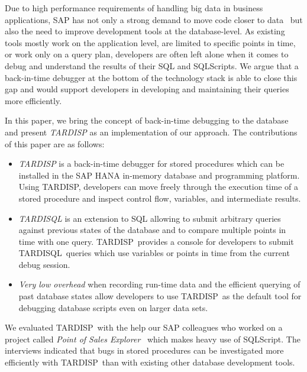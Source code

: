 \documentclass[english]{sig-alternate-05-2015}
\newcommand{\tool}{TARDISP}
\newcommand{\SQLextension}{TARDISQL}
\begin{document}
Due to high performance requirements of handling big data in business applications, SAP has not only a strong demand to move code closer to data~\cite{plattner2015memory} but also the need to improve development tools at the database-level. 
As existing tools mostly work on the application level, are limited to specific points in time, or work only on a query plan, developers are often left alone when it comes to debug and understand the results of their SQL and SQLScripts.
We argue that a back-in-time debugger at the bottom of the technology stack is able to close this gap and would support developers in developing and maintaining their queries more efficiently. 

In this paper, we bring the concept of back-in-time debugging to the database and present \emph{\tool} as an implementation of our approach.
The contributions of this paper are as follows:
\begin{itemize}
	\item \emph{\tool} is a back-in-time debugger for stored procedures which can be installed in the SAP HANA in-memory database and programming platform.
		Using \tool, developers can move freely through the execution time of a stored procedure and inspect control flow, variables, and intermediate results.
	
	\item \emph{\SQLextension} is an extension to SQL allowing to submit arbitrary queries against previous states of the database 
		and to compare multiple points in time with one query.
		\tool\, provides a console for developers to submit \SQLextension\, queries which use variables or points in time from the current debug session.

	\item \emph{Very low overhead} when recording run-time data and the efficient querying of past database states allow developers to use \tool\, as the default tool for debugging database scripts even on larger data sets.
	
\end{itemize}

We evaluated \tool\, with the help our SAP colleagues who worked on a project called \emph{Point of Sales Explorer}~\cite{plattner2015memory} which makes heavy use of SQLScript. 
The interviews indicated that bugs in stored procedures can be investigated more efficiently with \tool\, than with existing other database development tools.
\end{document}
